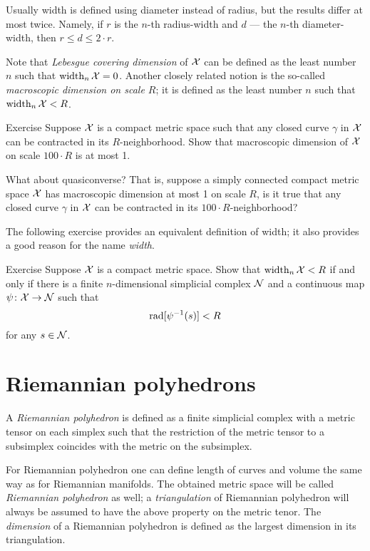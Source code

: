 Usually width is defined using diameter instead of radius, but the results differ at most twice.
Namely, if $r$ is the $n$-th radius-width and $d$ --- the $n$-th diameter-width, then 
$r\le d\le 2\cdot r$.

Note that \emph{Lebesgue covering dimension} of $\mathcal{X}$ can be defined as the least number $n$ such that $\operatorname{\rm width}\nolimits_n\mathcal{X}=0$.
Another closely related notion is the so-called \emph{macroscopic dimension on scale $R$};
it is defined as the  least number $n$ such that $\operatorname{\rm width}\nolimits_n\mathcal{X}<R$.


\begin{thm}{Exercise}\label{ex:macrodimension}
Suppose $\mathcal{X}$ is a compact metric space such that any closed curve $\gamma$ in $\mathcal{X}$ can be contracted in its $R$-neighborhood.
Show that macroscopic dimension of $\mathcal{X}$ on scale $100\cdot R$ is at most 1.

What about quasiconverse? That is, suppose a simply connected compact metric space $\mathcal{X}$ has macroscopic dimension at most 1 on scale $R$, is it true that any closed curve $\gamma$ in $\mathcal{X}$ can be contracted in its $100\cdot R$-neighborhood?
\end{thm}


The following exercise provides an equivalent definition of width;
it also provides a good reason for the name \emph{width}.

\begin{thm}{Exercise}\label{ex:width=suprad(inv)}
Suppose $\mathcal{X}$ is a compact metric space.
Show that $\operatorname{\rm width}\nolimits_n\mathcal{X}<R$ if and only if there is a finite $n$-dimensional simplicial complex $\mathcal{N}$ and a continuous map $\psi\colon\mathcal{X}\to \mathcal{N}$
such that 
\[\mathop{\rm rad}\nolimits[\psi^{-1}(s)]<R\]
for any $s\in \mathcal{N}$.
\end{thm}

\section{Riemannian polyhedrons}

A \emph{Riemannian polyhedron} is defined as a finite simplicial complex with a metric tensor on each simplex such that the restriction of the metric tensor to a subsimplex coincides with the metric on the subsimplex.

For Riemannian polyhedron one can define length of curves and volume the same way as for Riemannian manifolds.
The obtained metric space will be called \emph{Riemannian polyhedron} as well;
a \emph{triangulation} of Riemannian polyhedron  will always be assumed to have the above property on the metric tenor.
The \emph{dimension} of a Riemannian polyhedron is defined as the largest dimension in its triangulation.

